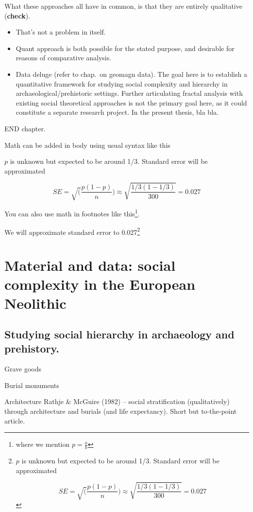 \documentclass[
  12pt,
]{book}
\begin{document}
What these approaches all have in common, is that they are entirely qualitative (\textbf{check}).

\begin{itemize}
\item
  That's not a problem in itself.
\item
  Quant approach is both possible for the stated purpose, and desirable for reasons of comparative analysis.
\item
  Data deluge (refer to chap.~on geomagn data). The goal here is to establish a quantitative framework for studying social complexity and hierarchy in archaeological/prehistoric settings. Further articulating fractal analysis with existing social theoretical approaches is not the primary goal here, as it could constitute a separate research project. In the present thesis, bla bla.
\end{itemize}

END chapter.

Math can be added in body using usual syntax like this

\(p\) is unknown but expected to be around 1/3. Standard error will be approximated

\[
SE = \sqrt(\frac{p(1-p)}{n}) \approx \sqrt{\frac{1/3 (1 - 1/3)} {300}} = 0.027
\]

You can also use math in footnotes like this\footnote{where we mention \(p = \frac{a}{b}\)}.

We will approximate standard error to 0.027\footnote{\(p\) is unknown but expected to be around 1/3. Standard error will be approximated

  \[
  SE = \sqrt(\frac{p(1-p)}{n}) \approx \sqrt{\frac{1/3 (1 - 1/3)} {300}} = 0.027
  \]}

\hypertarget{material}{%
\chapter{Material and data: social complexity in the European Neolithic}\label{material}}

\hypertarget{complexity-archaeo}{%
\section{Studying social hierarchy in archaeology and prehistory.}\label{complexity-archaeo}}

Grave goods

Burial monuments

Architecture Rathje \& McGuire (1982) -- social stratification (qualitatively) through architecture and burials (and life expectancy). Short but to-the-point article.
\end{document}
